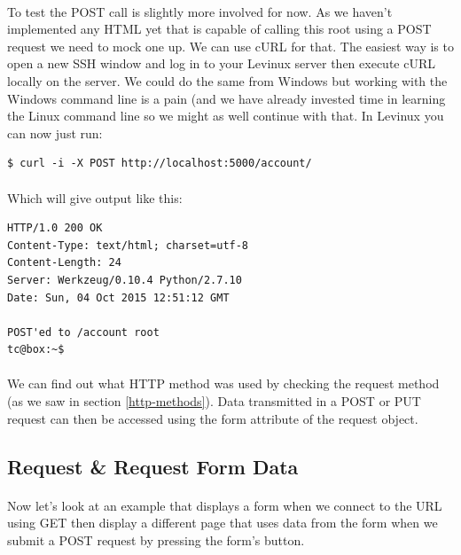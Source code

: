 \documentclass[12pt, a4paper, twoside]{book}
\begin{document}
\paragraph{} To test the POST call is slightly more involved for now. As we haven't implemented any HTML yet that is capable of calling this root using a POST request we need to mock one up. We can use cURL for that. The easiest way is to open a new SSH window and log in to your Levinux server then execute cURL locally on the server. We could do the same from Windows but working with the Windows command line is a pain (and we have already invested time in learning the Linux command line so we might as well continue with that. In Levinux you can now just run:

\begin{lstlisting}[style=DOS]
$ curl -i -X POST http://localhost:5000/account/
\end{lstlisting}

\paragraph{} Which will give output like this:

\begin{lstlisting}[style=DOS]
HTTP/1.0 200 OK
Content-Type: text/html; charset=utf-8
Content-Length: 24
Server: Werkzeug/0.10.4 Python/2.7.10
Date: Sun, 04 Oct 2015 12:51:12 GMT

POST'ed to /account root
tc@box:~$ 
\end{lstlisting}

\paragraph{} We can find out what HTTP method was used by checking the request method (as we saw in section \ref{http-methods}). Data transmitted in a POST or PUT request can then be accessed using the form attribute of the request object.

\subsection{Request \& Request Form Data}
\label{requests-objects-and-form-data}
\paragraph{} Now let's look at an example that displays a form when we connect to the URL using GET then display a different page that uses data from the form when we submit a POST request by pressing the form's button.
\end{document}
